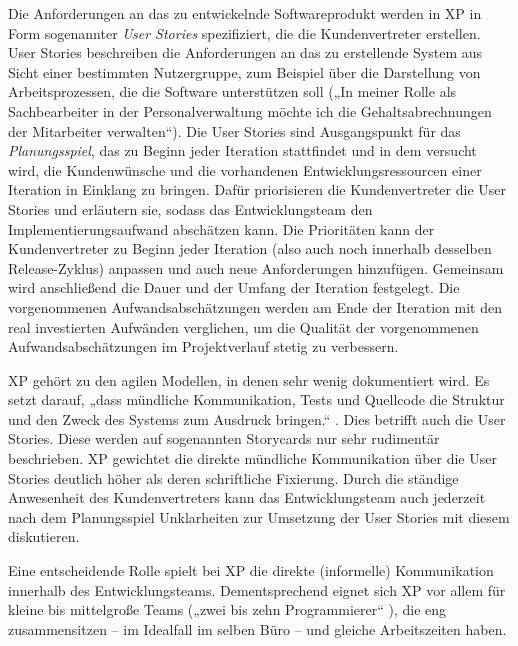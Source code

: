 \vspace{1mm} %


Die  Anforderungen an das zu entwickelnde Softwareprodukt werden in XP in Form sogenannter \textit{User Stories}  spezifiziert, die die Kundenvertreter erstellen. User \mbox{Stories} beschreiben die Anforderungen an das zu erstellende System aus Sicht einer bestimmten Nutzergruppe, zum Beispiel über die Darstellung von Arbeitsprozessen, die die Software unterstützen soll (\zb „In meiner Rolle als Sachbearbeiter in der Personalverwaltung möchte ich die Gehaltsabrechnungen der Mitarbeiter verwalten“). Die User Stories sind Ausgangspunkt für das \textit{Planungsspiel},  das zu Beginn jeder Iteration stattfindet und in dem versucht wird, die Kundenwünsche und die vorhandenen Entwicklungsressourcen einer Iteration in Einklang zu bringen. Dafür priorisieren die Kundenvertreter die User Stories und erläutern sie, sodass das Entwicklungsteam den Implementierungsaufwand abschätzen kann. Die Prioritäten kann der Kundenvertreter zu Beginn jeder Iteration (also auch noch innerhalb desselben Release-Zyklus) anpassen und auch neue Anforderungen hinzufügen. Gemeinsam wird anschließend die Dauer und der Umfang der Iteration festgelegt. Die vorgenommenen Aufwandsabschätzungen werden am Ende der Iteration mit den real investierten Aufwänden verglichen, um die Qualität der vorgenommenen Aufwandsabschätzungen im Projektverlauf stetig zu verbessern.

\vspace{1mm} %

XP gehört zu den agilen Modellen, in denen sehr wenig dokumentiert wird. Es setzt darauf, „dass mündliche Kommunikation, Tests und Quellcode die Struktur und den Zweck des Systems zum Ausdruck bringen.“ \cite[XVII]{bec03}. Dies betrifft auch die User Stories. Diese werden auf sogenannten Storycards nur sehr rudimentär beschrieben. XP gewichtet die direkte mündliche Kommunikation über die User Stories deutlich höher als deren schriftliche Fixierung. Durch die ständige Anwesenheit des Kundenvertreters kann das Entwicklungsteam auch jederzeit nach dem Planungsspiel Unklarheiten zur Umsetzung der User Stories mit diesem diskutieren. 

\vspace{1mm} %

Eine entscheidende Rolle spielt bei XP die direkte (informelle) Kommunikation innerhalb des Entwicklungsteams. Dementsprechend eignet sich XP vor allem für kleine bis mittelgroße Teams („zwei bis zehn Programmierer“ \cite[XVIII]{bec03}), die eng zusammensitzen – im Idealfall im selben Büro – und gleiche Arbeitszeiten haben. 

